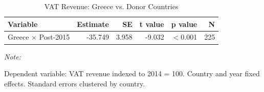\begin{table}[!h]
\centering
\caption{\label{tab:tab5}VAT Revenue: Greece vs. Donor Countries}
\centering
\begin{threeparttable}
\begin{tabular}[t]{lrrrrr}
\toprule
Variable & Estimate & SE & t value & p value & N\\
\midrule
Greece $\times$ Post-2015 & -35.749 & 3.958 & -9.032 & $<$0.001 & 225\\
\bottomrule
\end{tabular}
\begin{tablenotes}
\item \textit{Note: } 
\item Dependent variable: VAT revenue indexed to 2014 = 100. Country and year fixed effects. Standard errors clustered by country.
\end{tablenotes}
\end{threeparttable}
\end{table}
